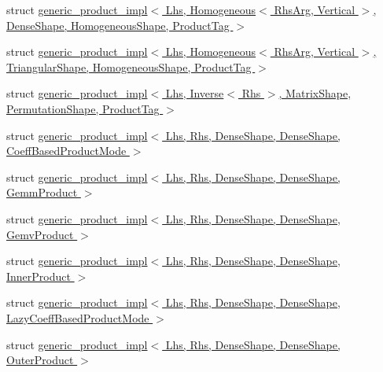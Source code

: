 \begin{DoxyCompactItemize}
\item 
struct \hyperlink{struct_eigen_1_1internal_1_1generic__product__impl_3_01_lhs_00_01_homogeneous_3_01_rhs_arg_00_014b037163b7cbbe39357e3613dfc53e44}{generic\+\_\+product\+\_\+impl$<$ Lhs, Homogeneous$<$ Rhs\+Arg, Vertical $>$, Dense\+Shape, Homogeneous\+Shape, Product\+Tag $>$}
\item 
struct \hyperlink{struct_eigen_1_1internal_1_1generic__product__impl_3_01_lhs_00_01_homogeneous_3_01_rhs_arg_00_0147df2ec49eff7619c8ef7c3518aa8800}{generic\+\_\+product\+\_\+impl$<$ Lhs, Homogeneous$<$ Rhs\+Arg, Vertical $>$, Triangular\+Shape, Homogeneous\+Shape, Product\+Tag $>$}
\item 
struct \hyperlink{struct_eigen_1_1internal_1_1generic__product__impl_3_01_lhs_00_01_inverse_3_01_rhs_01_4_00_01_ma98d6fa405abbfe2d34bd4bd3f95df76a}{generic\+\_\+product\+\_\+impl$<$ Lhs, Inverse$<$ Rhs $>$, Matrix\+Shape, Permutation\+Shape, Product\+Tag $>$}
\item 
struct \hyperlink{struct_eigen_1_1internal_1_1generic__product__impl_3_01_lhs_00_01_rhs_00_01_dense_shape_00_01_de59d3ba8d1712b00b0be8f7c4d1d76ce2}{generic\+\_\+product\+\_\+impl$<$ Lhs, Rhs, Dense\+Shape, Dense\+Shape, Coeff\+Based\+Product\+Mode $>$}
\item 
struct \hyperlink{struct_eigen_1_1internal_1_1generic__product__impl_3_01_lhs_00_01_rhs_00_01_dense_shape_00_01_def53e16cb724bbb32f6918835a9970bd5}{generic\+\_\+product\+\_\+impl$<$ Lhs, Rhs, Dense\+Shape, Dense\+Shape, Gemm\+Product $>$}
\item 
struct \hyperlink{struct_eigen_1_1internal_1_1generic__product__impl_3_01_lhs_00_01_rhs_00_01_dense_shape_00_01_de08ea17a2bb9af046a7c3ddff957c62b0}{generic\+\_\+product\+\_\+impl$<$ Lhs, Rhs, Dense\+Shape, Dense\+Shape, Gemv\+Product $>$}
\item 
struct \hyperlink{struct_eigen_1_1internal_1_1generic__product__impl_3_01_lhs_00_01_rhs_00_01_dense_shape_00_01_dea94f9499d65c14b4f0b179cda95872e3}{generic\+\_\+product\+\_\+impl$<$ Lhs, Rhs, Dense\+Shape, Dense\+Shape, Inner\+Product $>$}
\item 
struct \hyperlink{struct_eigen_1_1internal_1_1generic__product__impl_3_01_lhs_00_01_rhs_00_01_dense_shape_00_01_dee19e42566a0e6a2965776a41711daa09}{generic\+\_\+product\+\_\+impl$<$ Lhs, Rhs, Dense\+Shape, Dense\+Shape, Lazy\+Coeff\+Based\+Product\+Mode $>$}
\item 
struct \hyperlink{struct_eigen_1_1internal_1_1generic__product__impl_3_01_lhs_00_01_rhs_00_01_dense_shape_00_01_debd2b837cb01a8b00d65645ba310ac12a}{generic\+\_\+product\+\_\+impl$<$ Lhs, Rhs, Dense\+Shape, Dense\+Shape, Outer\+Product $>$}

\end{DoxyCompactItemize}

